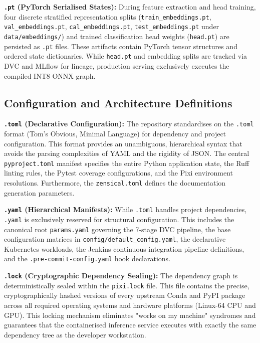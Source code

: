 \textbf{\texttt{.pt} (PyTorch Serialised States):} During feature extraction and head training, four discrete stratified representation splits (\texttt{train\_embeddings.pt}, \texttt{val\_embeddings.pt}, \texttt{cal\_embeddings.pt}, \texttt{test\_embeddings.pt} under \texttt{data/embeddings/}) and trained classification head weights (\texttt{head.pt}) are persisted as \texttt{.pt} files. These artifacts contain PyTorch tensor structures and ordered state dictionaries. While \texttt{head.pt} and embedding splits are tracked via DVC and MLflow for lineage, production serving exclusively executes the compiled INT8 ONNX graph.

\subsection{Configuration and Architecture Definitions}

\textbf{\texttt{.toml} (Declarative Configuration):} The repository standardises on the \texttt{.toml} format (Tom's Obvious, Minimal Language) for dependency and project configuration. This format provides an unambiguous, hierarchical syntax that avoids the parsing complexities of YAML and the rigidity of JSON. The central \texttt{pyproject.toml} manifest specifies the entire Python application state, the Ruff linting rules, the Pytest coverage configurations, and the Pixi environment resolutions. Furthermore, the \texttt{zensical.toml} defines the documentation generation parameters.

\textbf{\texttt{.yaml} (Hierarchical Manifests):} While \texttt{.toml} handles project dependencies, \texttt{.yaml} is exclusively reserved for structural configuration. This includes the canonical root \texttt{params.yaml} governing the 7-stage DVC pipeline, the base configuration matrices in \texttt{config/default\_config.yaml}, the declarative Kubernetes workloads, the Jenkins continuous integration pipeline definitions, and the \texttt{.pre-commit-config.yaml} hook declarations.

\textbf{\texttt{.lock} (Cryptographic Dependency Sealing):} The dependency graph is deterministically sealed within the \texttt{pixi.lock} file. This file contains the precise, cryptographically hashed versions of every upstream Conda and PyPI package across all required operating systems and hardware platforms (Linux-64 CPU and GPU). This locking mechanism eliminates "works on my machine" syndromes and guarantees that the containerised inference service executes with exactly the same dependency tree as the developer workstation.

